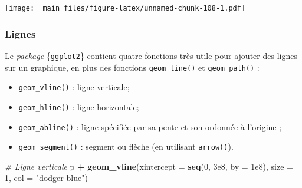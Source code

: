 \documentclass[
  11pt,
]{book}
\newenvironment{Shaded}{\begin{snugshade}}{\end{snugshade}}
\newcommand{\CharTok}[1]{\textcolor[rgb]{0.31,0.60,0.02}{#1}}
\newcommand{\CommentTok}[1]{\textcolor[rgb]{0.56,0.35,0.01}{\textit{#1}}}
\newcommand{\DataTypeTok}[1]{\textcolor[rgb]{0.13,0.29,0.53}{#1}}
\newcommand{\DecValTok}[1]{\textcolor[rgb]{0.00,0.00,0.81}{#1}}
\newcommand{\FloatTok}[1]{\textcolor[rgb]{0.00,0.00,0.81}{#1}}
\newcommand{\KeywordTok}[1]{\textcolor[rgb]{0.13,0.29,0.53}{\textbf{#1}}}
\newcommand{\NormalTok}[1]{#1}
\newcommand{\OperatorTok}[1]{\textcolor[rgb]{0.81,0.36,0.00}{\textbf{#1}}}
\newcommand{\OtherTok}[1]{\textcolor[rgb]{0.56,0.35,0.01}{#1}}
\newcommand{\StringTok}[1]{\textcolor[rgb]{0.31,0.60,0.02}{#1}}
\providecommand{\tightlist}{%
  \setlength{\itemsep}{0pt}\setlength{\parskip}{0pt}}
\numberwithin{equation}{section}
\numberwithin{countremarque}{section}
\begin{document}
\begin{Shaded}
\end{Shaded}

\texttt{[image: \_main\_files/figure-latex/unnamed-chunk-108-1.pdf]}

\hypertarget{graphiques_ggplot_annotations_lignes}{%
\subsubsection{Lignes}\label{graphiques_ggplot_annotations_lignes}}

Le \emph{package} \{\texttt{ggplot2}\} contient quatre fonctions très utile pour ajouter des lignes sur un graphique, en plus des fonctions \texttt{geom\_line()} et \texttt{geom\_path()} :

\begin{itemize}
\tightlist
\item
  \texttt{geom\_vline()} : ligne verticale;
\item
  \texttt{geom\_hline()} : ligne horizontale;
\item
  \texttt{geom\_abline()} : ligne spécifiée par sa pente et son ordonnée à l'origine ;
\item
  \texttt{geom\_segment()} : segment ou flèche (en utilisant \texttt{arrow()}).
\end{itemize}

\begin{Shaded}
\begin{Highlighting}[]
\CommentTok{\# Ligne verticale}
\NormalTok{p }\OperatorTok{+}\StringTok{ }\KeywordTok{geom\_vline}\NormalTok{(}\DataTypeTok{xintercept =} \KeywordTok{seq}\NormalTok{(}\DecValTok{0}\NormalTok{, }\FloatTok{3e8}\NormalTok{, }\DataTypeTok{by =} \FloatTok{1e8}\NormalTok{),}
               \DataTypeTok{size =} \DecValTok{1}\NormalTok{, }\DataTypeTok{col =} \StringTok{"dodger blue"}\NormalTok{)}
\end{Highlighting}
\end{Shaded}
\end{document}
